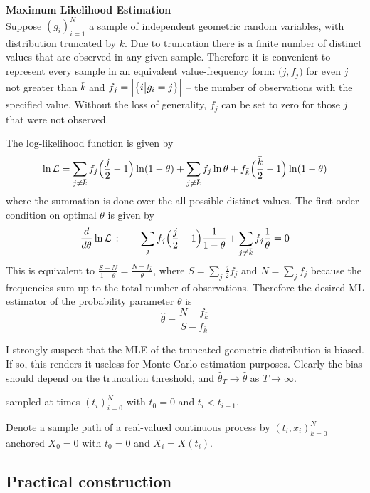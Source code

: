 \documentclass[a4paper]{report}
\begin{document}
\noindent \textbf{Maximum Likelihood Estimation} \hfill \\
Suppose ${(g_i)}_{i=1}^N$ a sample of independent geometric random variables, with
distribution truncated by $\bar{k}$. Due to truncation there is a finite number of
distinct values that are observed in any given sample. Therefore it is convenient to
represent every sample in an equivalent value-frequency form: ${\bigl(j, f_j\bigr)}$
for even $j$ not greater than $\bar{k}$ and 
$f_j = \Bigl| \bigl\{ i\bigr\rvert \bigl.g_i = j\bigr\}\Bigr|$ -- the number of
observations with the specified value. Without the loss of generality, $f_j$ can
be set to zero for those $j$ that were not observed.

The log-likelihood function is given by
\[
\ln\mathcal{L}
= \sum_{j\neq \bar{k}} f_j \Bigl(\frac{j}{2}-1\Bigr) \ln(1-\theta)
+ \sum_{j\neq \bar{k}} f_j \ln \theta
+ f_{\bar{k}} \Bigl( \frac{\bar{k}}{2} - 1 \Bigr) \ln(1-\theta)
\]
where the summation is done over the all possible distinct values. The first-order
condition on optimal $\theta$ is given by
\[
\frac{d}{d \theta} \ln\mathcal{L} \,:\quad
-\sum_j f_j \Bigl(\frac{j}{2}-1\Bigr) \frac{1}{1-\theta} + \sum_{j\neq \bar{k}} f_j \frac{1}{\theta} = 0
\]
This is equivalent to $\frac{S-N}{1-\theta} = \frac{N-f_{\bar{k}}}{\theta}$, where
$S = \sum_j \frac{j}{2} f_j$ and $N = \sum_j f_j$ because the frequencies sum up to
the total number of observations. Therefore the desired ML estimator of the probability
parameter $\theta$ is
\[ \hat{\theta} = \frac{N-f_{\bar{k}}}{S-f_{\bar{k}}} \]

I strongly suspect that the MLE of the truncated geometric distribution is biased. If so,
this renders it useless for Monte-Carlo estimation purposes. Clearly the bias should depend
on the truncation threshold, and $\hat{\theta}_T \to \hat{\theta}$ as $T\to \infty$.


sampled at times $(t_i)_{i=0}^N$ with $t_0=0$ and $t_i<t_{i+1}$.

Denote a sample path of a real-valued continuous process by ${(t_i, x_i)}_{k=0}^N$
anchored $X_0 = 0$ with $t_0 = 0$ and $X_i = X(t_i)$.


\subsection{Practical construction} %
\label{sub:practical_construction}
\end{document}
